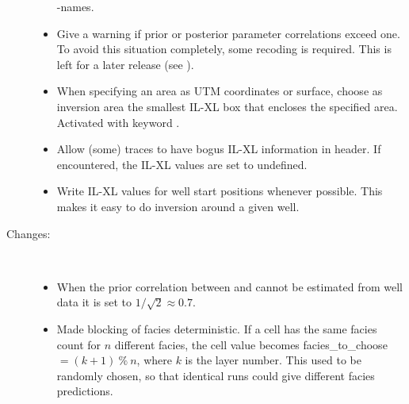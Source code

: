\begin{description}
\begin{itemize}
      \crava-names. 
    \item Give a warning if prior or posterior parameter correlations
      exceed one. To avoid this situation completely, some recoding is
      required. This is left for a later release (see
      ). 
    \item When specifying an area as UTM coordinates or surface,
      choose as inversion area the smallest IL-XL box that
      encloses the specified area. Activated with keyword
      . 
    \item Allow (some) traces to have bogus IL-XL information in
      header. If encountered, the IL-XL values are set to
      undefined. 
    \item Write IL-XL values for well start positions whenever
      possible. This makes it easy to do inversion around a given
      well. 
 \end{itemize}

\item [Changes:] \mbox{ }
  \begin{itemize}
    \item When the prior correlation between \vp and \vs cannot be
      estimated from well data it is set to $1/\sqrt{2}\approx
      0.7$. 
    \item Made blocking of facies deterministic. If a cell has the
      same facies count for $n$ different facies, the cell value
      becomes facies\_to\_choose $= (k + 1)\ \%\ n$, where $k$ is the
      layer number. This used to be randomly chosen, so that identical
      runs could give different facies predictions. 
  \end{itemize}


\end{description}

